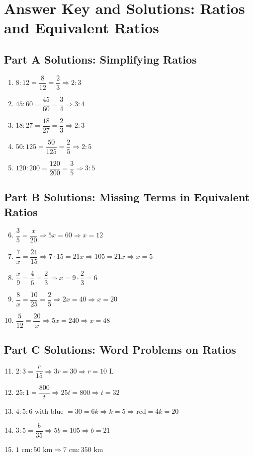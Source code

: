 \documentclass[14pt]{extarticle}
\begin{document}
\section*{Answer Key and Solutions: Ratios and Equivalent Ratios}

\subsection*{Part A Solutions: Simplifying Ratios}
\begin{enumerate}
  \item \(8:12 = \dfrac{8}{12}=\dfrac{2}{3} \Rightarrow \boxed{2:3}\)
  \item \(45:60 = \dfrac{45}{60}=\dfrac{3}{4} \Rightarrow \boxed{3:4}\)
  \item \(18:27 = \dfrac{18}{27}=\dfrac{2}{3} \Rightarrow \boxed{2:3}\)
  \item \(50:125 = \dfrac{50}{125}=\dfrac{2}{5} \Rightarrow \boxed{2:5}\)
  \item \(120:200 = \dfrac{120}{200}=\dfrac{3}{5} \Rightarrow \boxed{3:5}\)
\end{enumerate}

\subsection*{Part B Solutions: Missing Terms in Equivalent Ratios}
\begin{enumerate}
  \setcounter{enumi}{5}
  \item \(\dfrac{3}{5}=\dfrac{x}{20} \Rightarrow 5x=60 \Rightarrow \boxed{x=12}\)
  \item \(\dfrac{7}{x}=\dfrac{21}{15} \Rightarrow 7\cdot15=21x \Rightarrow 105=21x \Rightarrow \boxed{x=5}\)
  \item \(\dfrac{x}{9}=\dfrac{4}{6}=\dfrac{2}{3} \Rightarrow x=9\cdot\dfrac{2}{3}=\boxed{6}\)
  \item \(\dfrac{8}{x}=\dfrac{10}{25}=\dfrac{2}{5} \Rightarrow 2x=40 \Rightarrow \boxed{x=20}\)
  \item \(\dfrac{5}{12}=\dfrac{20}{x} \Rightarrow 5x=240 \Rightarrow \boxed{x=48}\)
\end{enumerate}

\subsection*{Part C Solutions: Word Problems on Ratios}
\begin{enumerate}
  \setcounter{enumi}{10}
  \item \(2:3=\dfrac{r}{15} \Rightarrow 3r=30 \Rightarrow \boxed{r=10\text{ L}}\)
  \item \(25:1=\dfrac{800}{t} \Rightarrow 25t=800 \Rightarrow \boxed{t=32}\)
  \item \(4:5:6\) with blue \(=30=6k \Rightarrow k=5 \Rightarrow \boxed{\text{red}=4k=20}\)
  \item \(3:5=\dfrac{b}{35} \Rightarrow 5b=105 \Rightarrow \boxed{b=21}\)
  \item \(1\text{ cm}:50\text{ km} \Rightarrow 7\text{ cm}: \boxed{350\text{ km}}\)
\end{enumerate}
\end{document}
